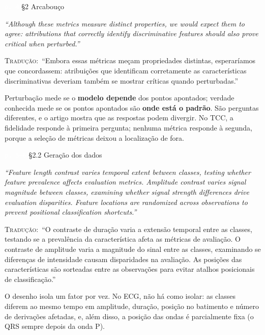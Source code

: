 \documentclass[11pt,a4paper]{article}
\newcommand{\pagechip}[1]{{\setlength{\fboxsep}{1.5pt}\colorbox{cAcc}{\textcolor{white}{\scriptsize\texttt{#1}}}}}
\newenvironment{origquote}{\par\itshape\small}{\par}
\newenvironment{tradquote}{\par\small\textsc{Tradução:}\ }{\par}
\newcommand{\explab}[1]{\par\smallskip{\small\color{cAcc}\textbf{\MakeUppercase{#1}}}\par}
\begin{document}
\begin{citacard}{\pagechip{p. 4} §2 Arcabouço}
\begin{origquote}“Although these metrics measure distinct properties, we would expect them to agree: attributions that correctly identify discriminative features should also prove critical when perturbed.”\end{origquote}
\begin{tradquote}“Embora essas métricas meçam propriedades distintas, esperaríamos que concordassem: atribuições que identificam corretamente as características discriminativas deveriam também se mostrar críticas quando perturbadas.”\end{tradquote}
\explab{Explicação}
Perturbação mede se o \textbf{modelo depende} dos pontos apontados; verdade conhecida mede se os pontos apontados são \textbf{onde está o padrão}. São perguntas diferentes, e o artigo mostra que as respostas podem divergir. No TCC, a fidelidade responde à primeira pergunta; nenhuma métrica responde à segunda, porque a seleção de métricas deixou a localização de fora.
\end{citacard}

\begin{citacard}{\pagechip{p. 5--6} §2.2 Geração dos dados}
\begin{origquote}“Feature length contrast varies temporal extent between classes, testing whether feature prevalence affects evaluation metrics. Amplitude contrast varies signal magnitude between classes, examining whether signal strength differences drive evaluation disparities. Feature locations are randomized across observations to prevent positional classification shortcuts.”\end{origquote}
\begin{tradquote}“O contraste de duração varia a extensão temporal entre as classes, testando se a prevalência da característica afeta as métricas de avaliação. O contraste de amplitude varia a magnitude do sinal entre as classes, examinando se diferenças de intensidade causam disparidades na avaliação. As posições das características são sorteadas entre as observações para evitar atalhos posicionais de classificação.”\end{tradquote}
\explab{Explicação}
O desenho isola um fator por vez. No ECG, não há como isolar: as classes diferem ao mesmo tempo em amplitude, duração, posição no batimento e número de derivações afetadas, e, além disso, a posição das ondas é parcialmente fixa (o QRS sempre depois da onda P).
\end{citacard}
\end{document}

